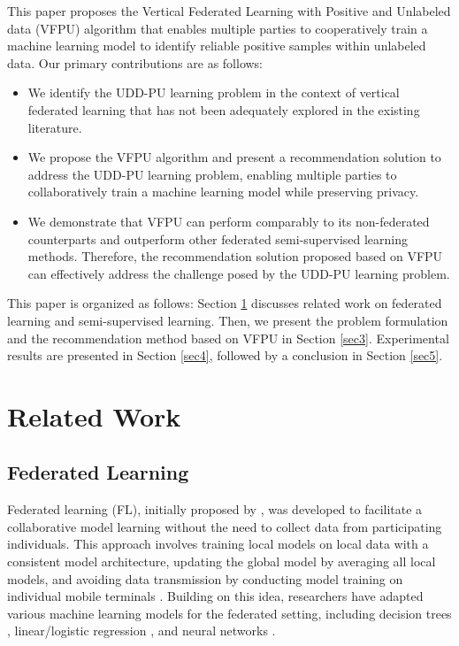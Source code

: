 \documentclass[10pt,journal,compsoc]{IEEEtran}
\begin{document}
This paper proposes the Vertical Federated Learning with Positive and Unlabeled data (VFPU) algorithm that enables multiple parties to cooperatively train a machine learning model to identify reliable positive samples within unlabeled data. Our primary contributions are as follows:
\begin{itemize}
	\item We identify the UDD-PU learning problem in the context of vertical federated learning that has not been adequately explored in the existing literature.
	\item We propose the VFPU algorithm and present a recommendation solution to address the UDD-PU learning problem, enabling multiple parties to  collaboratively train a machine learning model while preserving privacy.
	\item We demonstrate that VFPU can perform comparably to its non-federated counterparts and outperform other federated semi-supervised learning methods. Therefore, the recommendation solution proposed based on VFPU can effectively address the challenge posed by the UDD-PU learning problem.
\end{itemize}

This paper is organized as follows: Section \ref{sec2} discusses related work on federated learning and semi-supervised learning. Then, we present the problem formulation and the recommendation method based on VFPU in Section \ref{sec3}. Experimental results are presented in Section \ref{sec4}, followed by a conclusion in Section \ref{sec5}.  


\section{Related Work}
\label{sec2}
\subsection{Federated Learning}
Federated learning (FL), initially proposed by \citet{mcmahan2017communication}, was developed to facilitate a collaborative model learning without the need to collect data from participating individuals. This approach involves training local models on local data with a consistent model architecture, updating the global model by averaging all local models, and avoiding data transmission by conducting model training on individual mobile terminals \cite{konevcny2016federated,bonawitz2017practical,kairouz2021advances}. Building on this idea, researchers have adapted various machine learning models for the federated setting, including decision trees \cite{zhao2018inprivate,li2020practical}, linear/logistic regression \cite{li2020federated,hanzely2020lower,mohri2019agnostic}, and neural networks \cite{yurochkin2019bayesian,wang2020federated}.
\end{document}
